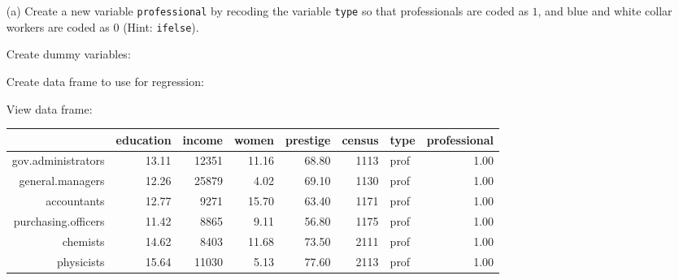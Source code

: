\documentclass[12pt,letterpaper]{article}
\begin{document}
\begin{enumerate}
	
	\item [(a)]
	Create a new variable \texttt{professional} by recoding the variable \texttt{type} so that professionals are coded as $1$, and blue and white collar workers are coded as $0$ (Hint: \texttt{ifelse}).
	
	\vspace{.25cm}
	
	\noindent Create dummy variables:
	
	
	\vspace{.1cm}
	
	\noindent Create data frame to use for regression:
	
	
	\vspace{.1cm}
	
	\noindent View data frame:
	
	
	\vspace{.1cm}
	
	

\begin{table}[ht!]
\centering
\begin{tabular}{rrrrrrlr}  \hline & education & income & women & prestige & census & type & professional \\   
	\hline gov.administrators & 13.11 & 12351 & 11.16 & 68.80 & 1113 & prof & 1.00 \\   general.managers & 12.26 & 25879 & 4.02 & 69.10 & 1130 & prof & 1.00 \\   accountants & 12.77 & 9271 & 15.70 & 63.40 & 1171 & prof & 1.00 \\   purchasing.officers & 11.42 & 8865 & 9.11 & 56.80 & 1175 & prof & 1.00 \\   chemists & 14.62 & 8403 & 11.68 & 73.50 & 2111 & prof & 1.00 \\   physicists & 15.64 & 11030 & 5.13 & 77.60 & 2113 & prof & 1.00 \\    \hline
\end{tabular}
\end{table}
	

\end{enumerate}
\end{document}
